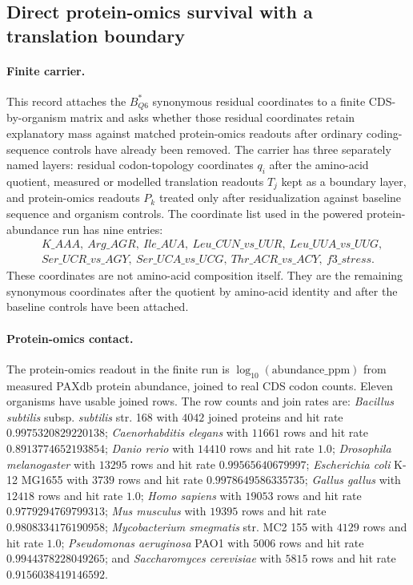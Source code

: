\subsection{Direct protein-omics survival with a translation boundary}
\label{sec:q6-direct-protein-omics-survival-with-translation-boundary-cross-layer}

\paragraph{Finite carrier.}
This record attaches the $B^{*}_{Q6}$ synonymous residual coordinates to a finite CDS-by-organism matrix and asks whether those residual coordinates retain explanatory mass against matched protein-omics readouts after ordinary coding-sequence controls have already been removed.  The carrier has three separately named layers: residual codon-topology coordinates $q_i$ after the amino-acid quotient, measured or modelled translation readouts $T_j$ kept as a boundary layer, and protein-omics readouts $P_k$ treated only after residualization against baseline sequence and organism controls.  The coordinate list used in the powered protein-abundance run has nine entries:
$$
\begin{aligned}
&K\_AAA,\ Arg\_AGR,\ Ile\_AUA,\ Leu\_CUN\_vs\_UUR,\ Leu\_UUA\_vs\_UUG,\\
&Ser\_UCR\_vs\_AGY,\ Ser\_UCA\_vs\_UCG,\ Thr\_ACR\_vs\_ACY,\ f3\_stress.
\end{aligned}
$$
These coordinates are not amino-acid composition itself.  They are the remaining synonymous coordinates after the quotient by amino-acid identity and after the baseline controls have been attached.

\paragraph{Protein-omics contact.}
The protein-omics readout in the finite run is $\log_{10}(\mathrm{abundance\_ppm})$ from measured PAXdb protein abundance, joined to real CDS codon counts.  Eleven organisms have usable joined rows.  The row counts and join rates are: \textit{Bacillus subtilis} subsp. \textit{subtilis} str. 168 with $4042$ joined proteins and hit rate $0.9975320829220138$; \textit{Caenorhabditis elegans} with $11661$ rows and hit rate $0.8913774652193854$; \textit{Danio rerio} with $14410$ rows and hit rate $1.0$; \textit{Drosophila melanogaster} with $13295$ rows and hit rate $0.99565640679997$; \textit{Escherichia coli} K-12 MG1655 with $3739$ rows and hit rate $0.9978649586335735$; \textit{Gallus gallus} with $12418$ rows and hit rate $1.0$; \textit{Homo sapiens} with $19053$ rows and hit rate $0.9779294769799313$; \textit{Mus musculus} with $19395$ rows and hit rate $0.9808334176190958$; \textit{Mycobacterium smegmatis} str. MC2 155 with $4129$ rows and hit rate $1.0$; \textit{Pseudomonas aeruginosa} PAO1 with $5006$ rows and hit rate $0.9944378228049265$; and \textit{Saccharomyces cerevisiae} with $5815$ rows and hit rate $0.9156038419146592$.

